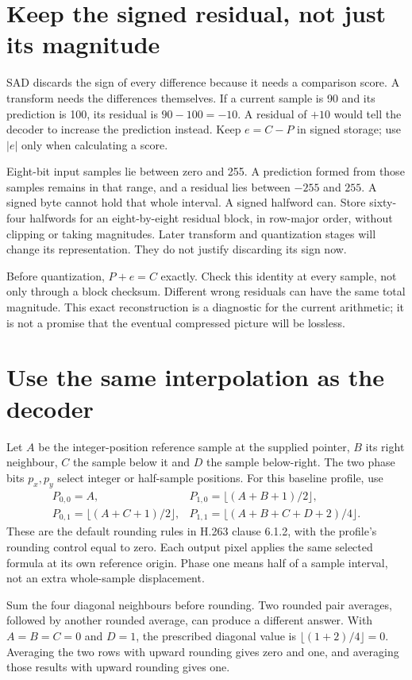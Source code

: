 \section{Keep the signed residual, not just its magnitude}
SAD discards the sign of every difference because it needs a comparison score.
A transform needs the differences themselves. If a current sample is 90 and its
prediction is 100, its residual is $90-100=-10$. A residual of $+10$ would tell
the decoder to increase the prediction instead. Keep $e=C-P$ in signed storage;
use $|e|$ only when calculating a score.

Eight-bit input samples lie between zero and 255. A prediction formed from those
samples remains in that range, and a residual lies between $-255$ and $255$.
A signed byte cannot hold that whole interval. A signed halfword can. Store
sixty-four halfwords for an eight-by-eight residual block, in row-major order,
without clipping or taking magnitudes. Later transform and quantization stages
will change its representation. They do not justify discarding its sign now.

Before quantization, $P+e=C$ exactly. Check this identity at every sample, not
only through a block checksum. Different wrong residuals can have the same total
magnitude. This exact reconstruction is a diagnostic for the current arithmetic;
it is not a promise that the eventual compressed picture will be lossless.

\section{Use the same interpolation as the decoder}
Let $A$ be the integer-position reference sample at the supplied pointer, $B$
its right neighbour, $C$ the sample below it and $D$ the sample below-right.
The two phase bits $p_x,p_y$ select integer or half-sample positions. For this
baseline profile, use
\[
\begin{array}{ll}
P_{0,0}=A,&P_{1,0}=\lfloor(A+B+1)/2\rfloor,\\[3pt]
P_{0,1}=\lfloor(A+C+1)/2\rfloor,&
P_{1,1}=\lfloor(A+B+C+D+2)/4\rfloor.
\end{array}
\]
These are the default rounding rules in H.263 clause 6.1.2, with the profile's
rounding control equal to zero. Each output pixel applies the same selected
formula at its own reference origin. Phase one means half of a sample interval,
not an extra whole-sample displacement.

Sum the four diagonal neighbours before rounding. Two rounded pair averages,
followed by another rounded average, can produce a different answer. With
$A=B=C=0$ and $D=1$, the prescribed diagonal value is
$\lfloor(1+2)/4\rfloor=0$. Averaging the two rows with upward rounding gives zero
and one, and averaging those results with upward rounding gives one.

